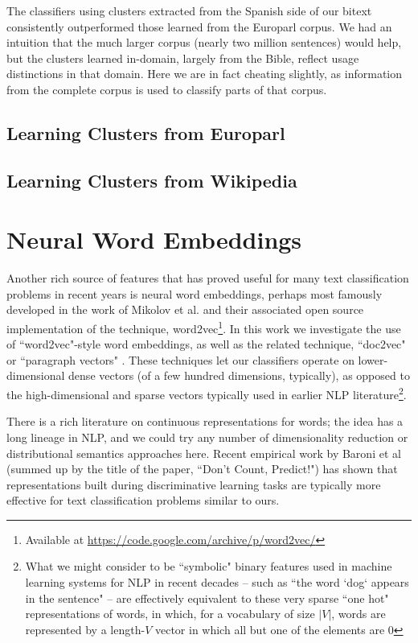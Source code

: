 The classifiers using clusters extracted from the Spanish side of our bitext
consistently outperformed those learned from the Europarl corpus. We had an
intuition that the much larger corpus (nearly two million sentences) would
help, but the clusters learned in-domain, largely from the Bible, reflect
usage distinctions in that domain. Here we are in fact cheating slightly, as
information from the complete corpus is used to classify parts of that corpus.


\subsection{Learning Clusters from Europarl}

\subsection{Learning Clusters from Wikipedia}


\section{Neural Word Embeddings}
Another rich source of features that has proved useful for many text
classification problems in recent years is neural word embeddings, perhaps most
famously developed in the work of Mikolov et al. \cite{mikolovword2vec} and
their associated open source implementation of the technique,
word2vec\footnote{Available at
\url{https://code.google.com/archive/p/word2vec/}}. In this work we investigate
the use of ``word2vec"-style word embeddings, as well as the related technique,
``doc2vec" or ``paragraph vectors"
\cite{dai-document-embedding-2015,quocle-distributed-representations-2014}.
These techniques let our classifiers operate on lower-dimensional dense vectors
(of a few hundred dimensions, typically), as opposed to the high-dimensional
and sparse vectors typically used in earlier NLP literature\footnote{
What we might consider to be ``symbolic" binary features used in machine
learning systems for NLP in recent decades -- such as ``the word `dog` appears
in the sentence" -- are effectively equivalent to these very sparse ``one hot"
representations of words, in which, for a vocabulary of size $|V|$, words are
represented by a length-$V$ vector in which all but one of the elements are 0}.

There is a rich literature on continuous representations for words; the idea
has a long lineage in NLP, and we could try any number of dimensionality
reduction or distributional semantics approaches here. Recent empirical work by
Baroni et al \cite{baroni2014don} (summed up by the title of the paper, ``Don't
Count, Predict!") has shown that representations built during discriminative
learning tasks are typically more effective for text classification problems
similar to ours.


